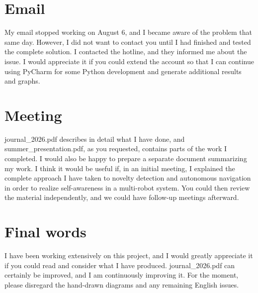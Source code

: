 \documentclass[a4paper]{article}
\begin{document}
   \section{Email}
      My email stopped working on August 6, and I became aware of the problem that same day. However, I did not want to contact you until I had finished and tested the complete solution. I contacted the hotline, and they informed me about the issue. I would appreciate it if you could extend the account so that I can continue using PyCharm for some Python development and generate additional results and graphs.

   \section{Meeting}
      journal\_2026.pdf describes in detail what I have done, and summer\_presentation.pdf, as you requested, contains parts of the work I completed. I would also be happy to prepare a separate document summarizing my work. I think it would be useful if, in an initial meeting, I explained the complete approach I have taken to novelty detection and autonomous navigation in order to realize self-awareness in a multi-robot system. You could then review the material independently, and we could have follow-up meetings afterward.
      
   \section{Final words}
      I have been working extensively on this project, and I would greatly appreciate it if you could read and consider what I have produced. journal\_2026.pdf can certainly be improved, and I am continuously improving it. For the moment, please disregard the hand-drawn diagrams and any remaining English issues.

      
      
\end{document}
